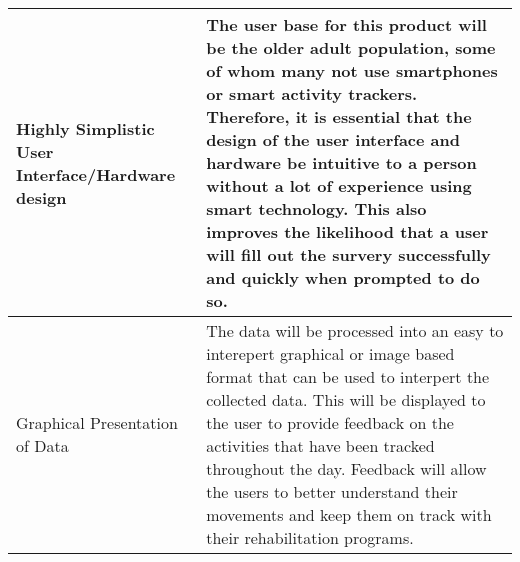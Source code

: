 \documentclass{article}
\begin{document}
\begin{center}
\begin{tabular}{ | m{7em} | m{32em}| }
        \hline
        Highly Simplistic User Interface/Hardware design & The user base for this product will be the older adult population, some of whom many not use smartphones or smart activity trackers. Therefore, it is essential that the design of the user interface and hardware be intuitive to a person without a lot of experience using smart technology. This also improves the likelihood that a user will fill out the survery successfully and quickly when prompted to do so.                                                                                                                                                                         \\
        \hline
        Graphical Presentation of Data                   & The data will be processed into an easy to interepert graphical or image based format that can be used to interpert the collected data. This will be displayed to the user to provide feedback on the activities that have been tracked throughout the day. Feedback will allow the users to better understand their movements and keep them on track with their rehabilitation programs.                                                                                                                                                                                                        \\
        \hline
    \end{tabular}
\end{center}
\pagebreak
\end{document}
